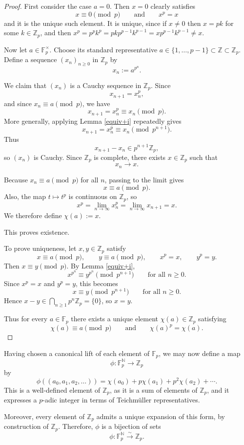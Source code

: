 \documentclass[oneside, a4paper, onecolumn, 11pt]{article}
\theoremstyle{definition}
\begin{document}
\begin{proof}
First consider the case $a=0$. Then $x=0$ clearly satisfies
\[ x\equiv 0 \pmod p\qquad\text{and}\qquad x^p=x\]
and it is the unique such element. It is unique, since if $x\ne 0$ then $x=pk$ for some $k\in\mathbb{Z}_p$, and then $x^p=p^pk^p=pkp^{p-1}k^{p-1}=xp^{p-1}k^{p-1}\ne x$.


Now let $a\in\mathbb{F}_p^\times$. Choose its standard representative
$a\in\{1,\dots,p-1\}\subset\mathbb{Z}\subset\mathbb{Z}_p$.
Define a sequence $(x_n)_{n\ge0}$ in $\mathbb{Z}_p$ by
\[x_n:=a^{p^n}.\]

We claim that $(x_n)$ is a Cauchy sequence in $\mathbb{Z}_p$. Since
\[x_{n+1}=x_n^p,\]
and since $x_n\equiv a \pmod p$, we have
\[x_{n+1}=x_n^p\equiv x_n \pmod p.\]
More generally, applying Lemma \ref{equiv+i} repeatedly gives
\[x_{n+1}=x_n^p \equiv x_n \pmod{p^{n+1}}.\]
Thus
\[x_{n+1}-x_n\in p^{n+1}\mathbb{Z}_p,\]
so $(x_n)$ is Cauchy. Since $\mathbb{Z}_p$ is complete, there exists
$x\in\mathbb{Z}_p$ such that
\[x_n\to x.\]

Because $x_n\equiv a \pmod p$ for all $n$, passing to the limit gives
\[x\equiv a \pmod p.\]
Also, the map $t\mapsto t^p$ is continuous on $\mathbb{Z}_p$, so
\[x^p=\lim_{n\to\infty} x_n^p=\lim_{n\to\infty} x_{n+1}=x.\]
We therefore define $\chi(a):=x$.

This proves existence.

To prove uniqueness, let $x,y\in\mathbb{Z}_p$ satisfy
\[x\equiv a \pmod p,\qquad y\equiv a \pmod p,\qquad x^p=x,\qquad y^p=y.\]
Then $x\equiv y\pmod p$. By Lemma \ref{equiv+i},
\[x^{p^n}\equiv y^{p^n}\pmod{p^{n+1}}\qquad\text{for all } n\ge0.\]
Since $x^p=x$ and $y^p=y$, this becomes
\[x\equiv y\pmod{p^{n+1}}\qquad\text{for all } n\ge0.\]
Hence $x-y\in \bigcap_{n\ge1} p^n\mathbb{Z}_p=\{0\}$, so $x=y$.

Thus for every $a\in\mathbb{F}_p$ there exists a unique element
$\chi(a)\in\mathbb{Z}_p$ satisfying
\[\chi(a)\equiv a \pmod p\qquad\text{and}\qquad\chi(a)^p=\chi(a).\]
\end{proof}

Having chosen a canonical lift of each element of $\mathbb{F}_p$, we may now define a map
\[\phi:\mathbb{F}_p^{\mathbb N}\to \mathbb{Z}_p\]
by
\[\phi((a_0,a_1,a_2,\ldots))=\chi(a_0)+p\chi(a_1)+p^2\chi(a_2)+\cdots.\]
This is a well-defined element of $\mathbb{Z}_p$, as it is a sum of elements of $\mathbb{Z}_p$, and it expresses a $p$-adic integer in terms of Teichmüller representatives.

Moreover, every element of $\mathbb{Z}_p$ admits a unique expansion of this form, by construction of $\mathbb{Z}_p$. Therefore, $\phi$ is a bijection of sets
\[\phi:\mathbb{F}_p^{\mathbb N}\xrightarrow{\sim}\mathbb{Z}_p.\]
\end{document}
